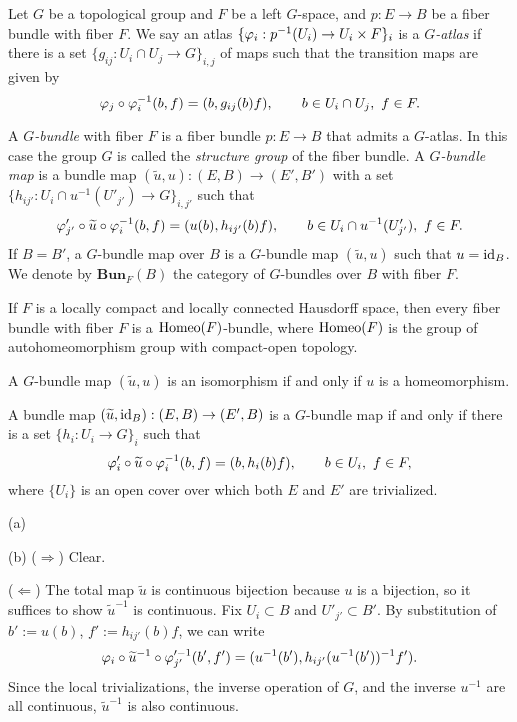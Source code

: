 \documentclass{../../large}
\begin{document}
\begin{prb}
Let $G$ be a topological group and $F$ be a left $G$-space, and $p:E\to B$ be a fiber bundle with fiber $F$.
We say an atlas $\{\varphi_i:p^{-1}(U_i)\to U_i\times F\}_i$ is a \emph{$G$-atlas} if there is a set $\{g_{ij}:U_i\cap U_j\to G\}_{i,j}$ of maps such that the transition maps are given by
\[\varphi_j\circ\varphi_i^{-1}(b,f)=(b,g_{ij}(b)f),
\qquad b\in U_i\cap U_j,\ f\in F.\]

A \emph{$G$-bundle} with fiber $F$ is a fiber bundle $p:E\to B$ that admits a $G$-atlas.
In this case the group $G$ is called the \emph{structure group} of the fiber bundle.
A \emph{$G$-bundle map} is a bundle map $(\tilde u,u):(E,B)\to(E',B')$ with a set $\{h_{ij'}:U_i\cap u^{-1}(U'_{j'})\to G\}_{i,j'}$ such that
\[\varphi'_{j'}\circ\widetilde u\circ \varphi_i^{-1}(b,f)=(u(b),h_{ij'}(b)f),
\qquad b\in U_i\cap u^{-1}(U'_{j'}),\ f\in F.\]
If $B=B'$, a $G$-bundle map over $B$ is a $G$-bundle map $(\tilde u,u)$ such that $u=\operatorname{id}_B$.
We denote by $\mathbf{Bun}_F(B)$ the category of $G$-bundles over $B$ with fiber $F$.
\begin{parts}
\item If $F$ is a locally compact and locally connected Hausdorff space, then every fiber bundle with fiber $F$ is a $\operatorname{Homeo}(F)$-bundle, where $\operatorname{Homeo}(F)$ is the group of autohomeomorphism group with compact-open topology.
\item A $G$-bundle map $(\tilde u,u)$ is an isomorphism if and only if $u$ is a homeomorphism.
\item A bundle map $(\widetilde u,\operatorname{id}_B):(E,B)\to(E',B)$ is a $G$-bundle map if and only if there is a set $\{h_i:U_i\to G\}_i$ such that
\[\varphi_i'\circ\widetilde u\circ\varphi_i^{-1}(b,f)=(b,h_i(b)f),
\qquad b\in U_i,\ f\in F,\]
where $\{U_i\}$ is an open cover over which both $E$ and $E'$ are trivialized.
\end{parts}
\end{prb}
\begin{pf}
(a)

(b)
($\Rightarrow$)
Clear.

($\Leftarrow$)
The total map $\tilde u$ is continuous bijection because $u$ is a bijection, so it suffices to show $\tilde u^{-1}$ is continuous.
Fix $U_i\subset B$ and $U'_{j'}\subset B'$.
By substitution of $b':=u(b)$, $f':=h_{ij'}(b)f$, we can write
\[\varphi_i\circ\widetilde u^{-1}\circ\varphi_{j'}'^{-1}(b',f')=(u^{-1}(b'),h_{ij'}(u^{-1}(b'))^{-1}f').\]
Since the local trivializations, the inverse operation of $G$, and the inverse $u^{-1}$ are all continuous, $\tilde u^{-1}$ is also continuous.
\end{pf}
\end{document}
